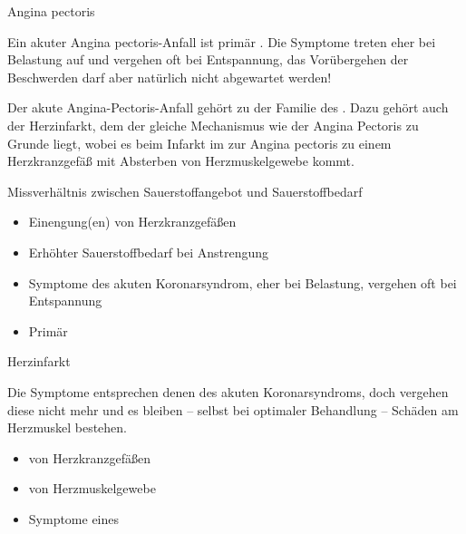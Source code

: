 \TextSlide
{Angina pectoris}
{
\label{topic:angina-pectoris}

\noindent{}
Ein akuter Angina pectoris-Anfall ist primär . Die Symptome
treten eher bei Belastung auf und vergehen oft bei
Entspannung, das Vorübergehen der Beschwerden darf aber
natürlich nicht abgewartet werden!



Der akute Angina-Pectoris-Anfall gehört zu der Familie des
. Dazu gehört auch der
Herzinfarkt, dem der gleiche Mechanismus wie der Angina Pectoris zu
Grunde liegt, wobei es beim Infarkt im  zur Angina
pectoris zu einem  Herzkranzgefäß
mit Absterben von Herzmuskelgewebe kommt.
}
{%
Missverhältnis zwischen Sauerstoffangebot und  
Sauerstoffbedarf
\begin{itemize}
  \item Einengung(en) von Herzkranzgefäßen
  \item Erhöhter Sauerstoffbedarf bei Anstrengung
  \item Symptome des akuten Koronarsyndrom,  eher bei
  Belastung, vergehen oft bei Entspannung
  \item Primär 
\end{itemize}
}
{}
{}
{}




\TextSlide
{Herzinfarkt}
{
\label{topic:herzinfarkt}
\label{topic:myocardinfarkt}
\label{topic:mci}

\noindent{}
Die Symptome entsprechen denen des akuten Koronarsyndroms, 
doch vergehen diese nicht mehr und es bleiben --
selbst bei optimaler Behandlung -- Schäden am Herzmuskel
bestehen. 


}
{%
\begin{itemize}
  \item {} von Herzkranzgefäßen
  \item {} von Herzmuskelgewebe
  \item Symptome eines 
\end{itemize}}
{}
{}
{}


